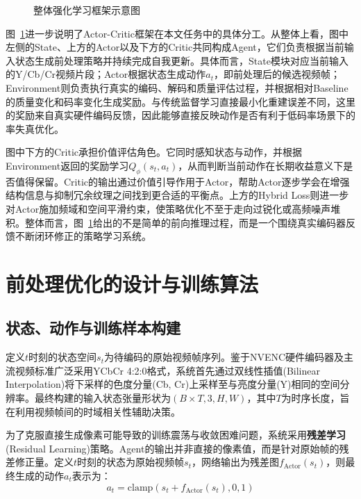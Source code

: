 \begin{figure}[!htbp]
  \centering
  \resizebox{0.88\textwidth}{!}{}
  \caption{整体强化学习框架示意图}
  \label{fig:rl-closed-loop}
\end{figure}

图~\ref{fig:rl-closed-loop}进一步说明了Actor-Critic框架在本文任务中的具体分工。从整体上看，图中左侧的State、上方的Actor以及下方的Critic共同构成Agent，它们负责根据当前输入状态生成前处理策略并持续完成自我更新。具体而言，State模块对应当前输入的Y/Cb/Cr视频片段；Actor根据状态生成动作$a_t$，即前处理后的候选视频帧；Environment则负责执行真实的编码、解码和质量评估过程，并根据相对Baseline的质量变化和码率变化生成奖励。与传统监督学习直接最小化重建误差不同，这里的奖励来自真实硬件编码反馈，因此能够直接反映动作是否有利于低码率场景下的率失真优化。

图中下方的Critic承担价值评估角色。它同时感知状态与动作，并根据Environment返回的奖励学习$Q_\phi(s_t,a_t)$，从而判断当前动作在长期收益意义下是否值得保留。Critic的输出通过价值引导作用于Actor，帮助Actor逐步学会在增强结构信息与抑制冗余纹理之间找到更合适的平衡点。上方的Hybrid Loss则进一步对Actor施加频域和空间平滑约束，使策略优化不至于走向过锐化或高频噪声堆积。整体而言，图~\ref{fig:rl-closed-loop}给出的不是简单的前向推理过程，而是一个围绕真实编码器反馈不断闭环修正的策略学习系统。

\section{前处理优化的设计与训练算法}

\subsection{状态、动作与训练样本构建}

定义$t$时刻的状态空间$s_t$为待编码的原始视频帧序列。鉴于NVENC硬件编码器及主流视频标准广泛采用YCbCr 4:2:0格式，系统首先通过双线性插值(Bilinear Interpolation)将下采样的色度分量(Cb, Cr)上采样至与亮度分量(Y)相同的空间分辨率。最终构建的输入状态张量形状为$(B \times T, 3, H, W)$，其中$T$为时序长度，旨在利用视频帧间的时域相关性辅助决策。

为了克服直接生成像素可能导致的训练震荡与收敛困难问题，系统采用\textbf{残差学习}(Residual Learning)策略\cite{He2015DeepRL}。Agent的输出并非直接的像素值，而是针对原始帧的残差修正量。定义$t$时刻的状态为原始视频帧$s_t$，网络输出为残差图$f_{\text{Actor}}(s_t)$，则最终生成的动作$a_t$表示为：
\begin{equation}
  a_t = \text{clamp}(s_t + f_{\text{Actor}}(s_t), 0, 1)
  \label{eq:action}
\end{equation}

